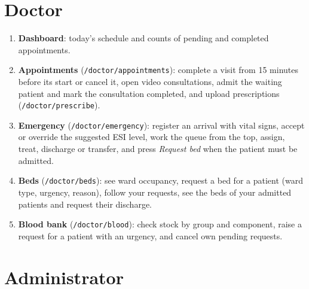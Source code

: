 \section{Doctor}

\begin{enumerate}
    \item \textbf{Dashboard}: today's schedule and counts of pending and completed appointments.
    \item \textbf{Appointments} (\texttt{/doctor/appointments}): complete a visit from 15 minutes before its start or cancel it, open video consultations, admit the waiting patient and mark the consultation completed, and upload prescriptions (\texttt{/doctor/prescribe}).
    \item \textbf{Emergency} (\texttt{/doctor/emergency}): register an arrival with vital signs, accept or override the suggested ESI level, work the queue from the top, assign, treat, discharge or transfer, and press \emph{Request bed} when the patient must be admitted.
    \item \textbf{Beds} (\texttt{/doctor/beds}): see ward occupancy, request a bed for a patient (ward type, urgency, reason), follow your requests, see the beds of your admitted patients and request their discharge.
    \item \textbf{Blood bank} (\texttt{/doctor/blood}): check stock by group and component, raise a request for a patient with an urgency, and cancel own pending requests.
\end{enumerate}

\section{Administrator}

